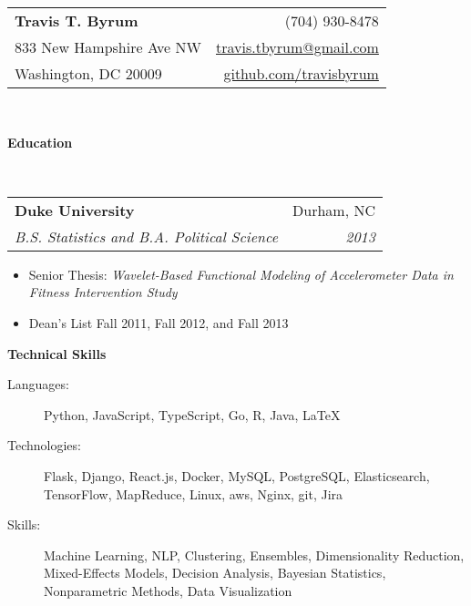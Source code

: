 \documentclass[letterpaper,12pt]{article}
\makeatletter
\newcommand{\resitem}[1]{\item #1 \vspace{-2pt}}
\newcommand{\resheading}[1]{{\large \colorbox{mygrey}{\begin{minipage}{\textwidth}{\textbf{#1 \vphantom{p\^{E}}}}\end{minipage}}}}
\newcommand{\ressubheading}[4]{
\begin{tabular*}{6.9in}{l@{\extracolsep{\fill}}r}
		\textbf{#1} & #2 \\
		\textit{#3} & \textit{#4} \\
\end{tabular*}\vspace{-6pt}}
\makeatother
\begin{document}
\newcommand{\mywebheader}{
\begin{tabular*}
	{7in}
	{l@{\extracolsep{\fill}}r}
		\textbf{\Huge Travis T. Byrum}  & (704) 930-8478\\
		833 New Hampshire Ave NW & \href{mailto:travis.tbyrum@gmail.com}{travis.tbyrum@gmail.com} \\
		Washington, DC 20009 & \href{https://github.com/travisbyrum}{github.com/travisbyrum}\\
\end{tabular*}
\\
\vspace{0.1in}}

\mywebheader
\resheading{Education}
\\
\ressubheading
  {Duke University}
  {Durham, NC}
  {B.S. Statistics and B.A. Political Science}
  {2013}
  {
	  \footnotesize
		  \begin{itemize}
			  \resitem{Senior Thesis: \textit{Wavelet-Based Functional Modeling of Accelerometer Data in Fitness Intervention Study}} 
			  \resitem{Dean's List Fall 2011, Fall 2012, and Fall 2013} 
		  \end{itemize}

\resheading
  {Technical Skills}
	\begin{description}
		\item[Languages:]{\footnotesize Python, JavaScript, TypeScript, Go, R, Java, \LaTeX}
		\item[Technologies:]{\footnotesize Flask, Django, React.js, Docker, MySQL, PostgreSQL, Elasticsearch, TensorFlow, MapReduce, Linux, aws, Nginx, git, Jira}
		\item[Skills:]{\footnotesize Machine Learning, NLP, Clustering, Ensembles, Dimensionality Reduction, Mixed-Effects Models, Decision Analysis, Bayesian Statistics, Nonparametric Methods, Data Visualization}
	\end{description}

}
\end{document}
